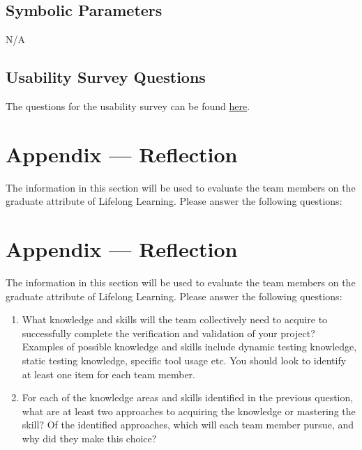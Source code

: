 \documentclass[12pt, titlepage]{article}
\begin{document}
\subsection{Symbolic Parameters}

N/A

\subsection{Usability Survey Questions}

The questions for the usability survey can be found \href{https://docs.google.com/forms/d/e/1FAIpQLSeHQbMiXtfpNlbR3EWfvaZtoYHO0kur1HRKV1nBb5CGQUYkUQ/viewform}{here}.

\newpage{}
\section*{Appendix --- Reflection}

The information in this section will be used to evaluate the team members on the
graduate attribute of Lifelong Learning.  Please answer the following questions:

\newpage{}
\section*{Appendix --- Reflection}


The information in this section will be used to evaluate the team members on the
graduate attribute of Lifelong Learning.  Please answer the following questions:

\begin{enumerate}
  \item What knowledge and skills will the team collectively need to acquire to
  successfully complete the verification and validation of your project?
  Examples of possible knowledge and skills include dynamic testing knowledge,
  static testing knowledge, specific tool usage etc.  You should look to
  identify at least one item for each team member.
  \item For each of the knowledge areas and skills identified in the previous
  question, what are at least two approaches to acquiring the knowledge or
  mastering the skill?  Of the identified approaches, which will each team
  member pursue, and why did they make this choice?
\end{enumerate}
\end{document}
